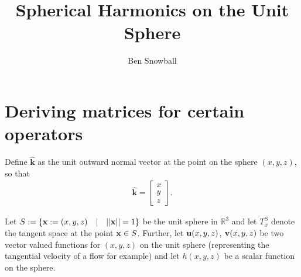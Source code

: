 \documentclass[11pt, oneside]{article}   	%
\title{Spherical Harmonics on the Unit Sphere}
\author{Ben Snowball}
\newcommand{\R}{\mathbb{R}}
\newcommand{\unitvec}{\hat{\bm{k}}}
\begin{document}
\maketitle


\section{Deriving matrices for certain operators}

Define \(\unitvec\) as the unit outward normal vector at the point on the sphere \((x,y,z)\), so that
\begin{align}
\unitvec = \begin{bmatrix} x \\ y \\ z \end{bmatrix}.
\end{align}

Let \(S := \{ \bold{x} := (x,y,z) \quad | \quad ||\bold{x}|| = 1\}\) be the unit sphere in \(\R^3\) and let \(T_x^S\) denote the tangent space at the point \(\bold{x} \in S\). Further, let \(\bold{u}(x,y,z)\), \(\bold{v}(x,y,z)\) be two vector valued functions for \((x,y,z)\) on the unit sphere (representing the tangential velocity of a flow for example) and let \(h(x,y,z)\) be a scalar function on the sphere.
\end{document}
